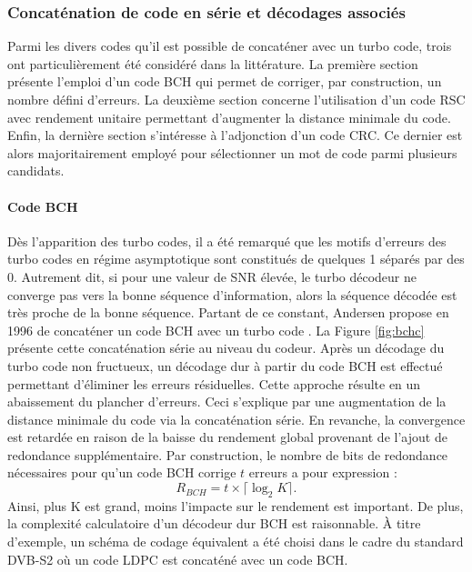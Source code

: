 
\subsubsection{Concaténation de code en série et décodages associés}
Parmi les divers codes qu'il est possible de concaténer avec un turbo code, trois ont particulièrement été considéré dans la littérature. La première section présente l'emploi d'un code BCH qui permet de corriger, par construction, un nombre défini d'erreurs. La deuxième section concerne l'utilisation d'un code RSC avec rendement unitaire permettant d'augmenter la distance minimale du code. Enfin, la dernière section s'intéresse à l'adjonction d'un code CRC. Ce dernier est alors majoritairement employé pour sélectionner un mot de code parmi plusieurs candidats.
\paragraph{Code BCH}
Dès l'apparition des turbo codes, il a été remarqué que les motifs d'erreurs des turbo codes en régime asymptotique sont constitués de quelques 1 séparés par des 0. Autrement dit, si pour une valeur de SNR élevée, le turbo décodeur ne converge pas vers la bonne séquence d'information, alors la séquence décodée est très proche de la bonne séquence. Partant de ce constant, Andersen propose en 1996 de concaténer un code BCH avec un turbo code \cite{andersenBCH}. La Figure \ref{fig:bchc} présente cette concaténation série au niveau du codeur. Après un décodage du turbo code non fructueux, un décodage dur à partir du code BCH est effectué permettant d'éliminer les erreurs résiduelles. Cette approche résulte en un abaissement du plancher d'erreurs. Ceci s'explique par une augmentation de la distance minimale du code via la concaténation série. En revanche, la convergence est retardée en raison de la baisse du rendement global provenant de l'ajout de redondance supplémentaire. Par construction, le nombre de bits de redondance nécessaires pour qu'un code BCH corrige $t$ erreurs a pour expression : \[R_{BCH} = t \times \lceil \log_2 K\rceil.\]
Ainsi, plus K est grand, moins l'impacte sur le rendement est important. De plus, la complexité calculatoire d'un décodeur dur BCH est raisonnable. À titre d'exemple, un schéma de codage équivalent a été choisi dans le cadre du standard DVB-S2 où  un code LDPC est concaténé avec un code BCH.

